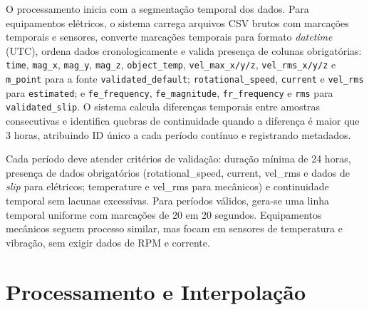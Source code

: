 O processamento inicia com a segmentação temporal dos dados. Para equipamentos elétricos, o sistema carrega arquivos CSV brutos com marcações temporais e sensores, converte marcações temporais para formato \textit{datetime} (UTC), ordena dados cronologicamente e valida presença de colunas obrigatórias: \texttt{time}, \texttt{mag\_x}, \texttt{mag\_y}, \texttt{mag\_z}, \texttt{object\_temp}, \texttt{vel\_max\_x/y/z}, \texttt{vel\_rms\_x/y/z} e \texttt{m\_point} para a fonte \texttt{validated\_default}; \texttt{rotational\_speed}, \texttt{current} e \texttt{vel\_rms} para \texttt{estimated}; e \texttt{fe\_frequency}, \texttt{fe\_magnitude}, \texttt{fr\_frequency} e \texttt{rms} para \texttt{validated\_slip}. O sistema calcula diferenças temporais entre amostras consecutivas e identifica quebras de continuidade quando a diferença é maior que 3 horas, atribuindo ID único a cada período contínuo e registrando metadados.

Cada período deve atender critérios de validação: duração mínima de 24 horas, presença de dados obrigatórios (rotational\_speed, current, vel\_rms e dados de \textit{slip} para elétricos; temperature e vel\_rms para mecânicos) e continuidade temporal sem lacunas excessivas. Para períodos válidos, gera-se uma linha temporal uniforme com marcações de 20 em 20 segundos. Equipamentos mecânicos seguem processo similar, mas focam em sensores de temperatura e vibração, sem exigir dados de RPM e corrente.

\section{Processamento e Interpolação}
\label{sec:processamento_interpolacao}

